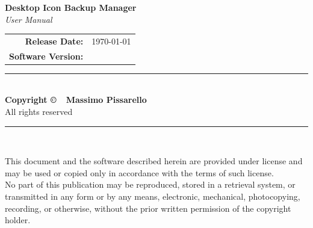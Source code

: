 \documentclass[a4paper,11pt]{article}
\begin{document}
\newpage
\thispagestyle{empty}

\vspace{1cm}

\begin{center}

  \begin{tcolorbox}[
      colback=white,
      colframe=blue!30,
      width=0.75\textwidth,
      arc=5mm,
      boxrule=1pt,
      left=20pt,
      right=20pt,
      top=15pt,
      bottom=15pt
    ]
    \centering
    {\Large\textbf{\color{blue!70!black}Desktop Icon Backup Manager}}\\[0.4cm]
    {\large\textit{User Manual}}
  \end{tcolorbox}

  \vspace{2cm}

  {\small\color{gray}
    \begin{tabular}{rl}
      \textbf{Release Date:} & \today \\[0.2cm]
      \textbf{Software Version:} &  \\
    \end{tabular}
  }

  \vspace{2.5cm}

  \begin{minipage}{0.7\textwidth}
    \centering

    {\color{blue!70!black}\rule{0.8\textwidth}{0.5pt}}\\[0.5cm]

    {\small\textbf{Copyright \copyright\ \the\year\ Massimo Pissarello}}\\[0.2cm]
    {\footnotesize All rights reserved}\\[0.5cm]

    {\color{blue!70!black}\rule{0.8\textwidth}{0.5pt}}\\[1cm]

    {\footnotesize\color{gray}
      \begin{flushleft}
        This document and the software described herein are provided
        under license and may be used
        or copied only in accordance with the terms of such license.\\[0.4cm]

        No part of this publication may be reproduced, stored in a
        retrieval system, or transmitted
        in any form or by any means, electronic, mechanical,
        photocopying, recording, or otherwise,
        without the prior written permission of the copyright holder.\\[0.4cm]


\end{flushleft}}
\end{minipage}
\end{center}
\end{document}
